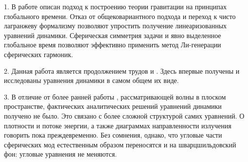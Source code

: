 \documentclass[\docroot/reports/draft/report.tex]{subfiles}
\begin{document}
\onlyinsubfile{\tableofcontents}

1. В работе описан подход к построению теории гравитации на принципах глобального времени. Отказ от общековариантного подхода и переход к чисто лагранжеву формализму позволяют упростить получение линеаризованных уравнений динамики. Сферическая симметрия задачи и явно выделенное глобальное время позволяют эффективно применить метод Ли-генерации сферических гармоник.

2. Данная работа является продолжением трудов \cite{burlankov_space_dynamics} и \cite{burlankov_grav_waves}. Здесь впервые получены и исследованы уравнения динамики в самом общем их виде.

3. В отличие от более ранней работы \cite{Vas2018b}, рассматривающей волны в плоском пространстве, фактических аналитических решений уравнений динамики получено не было. Это связано с более сложной структурой самих уравнений. О плотности и потоке энергии, а также диаграммах направленности излучения говорить пока преждевременно. Без сомнения, однако, что угловые части сферических мод естественным образом переносятся и на шварцшильдовский фон: угловые уравнения не меняются.

\end{document}
